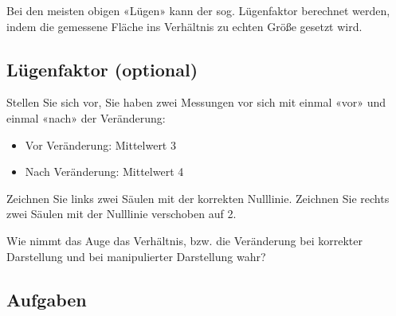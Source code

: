 Bei den meisten obigen «Lügen» kann der sog. Lügenfaktor berechnet werden, indem die gemessene Fläche ins Verhältnis zu echten Größe gesetzt wird.
\newpage
\subsection*{Lügenfaktor (optional)}


Stellen Sie sich vor, Sie haben zwei Messungen vor sich mit einmal «vor» und einmal «nach» der Veränderung:
\begin{itemize}
\item Vor Veränderung: Mittelwert 3
\item Nach Veränderung: Mittelwert 4
\end{itemize}

Zeichnen Sie links zwei Säulen mit der korrekten Nulllinie. Zeichnen Sie rechts zwei Säulen mit der Nulllinie verschoben auf 2.


Wie nimmt das Auge das Verhältnis, bzw. die Veränderung bei korrekter Darstellung und bei manipulierter Darstellung wahr?



\subsection*{Aufgaben}

\TNTeop{}{}


\newpage
